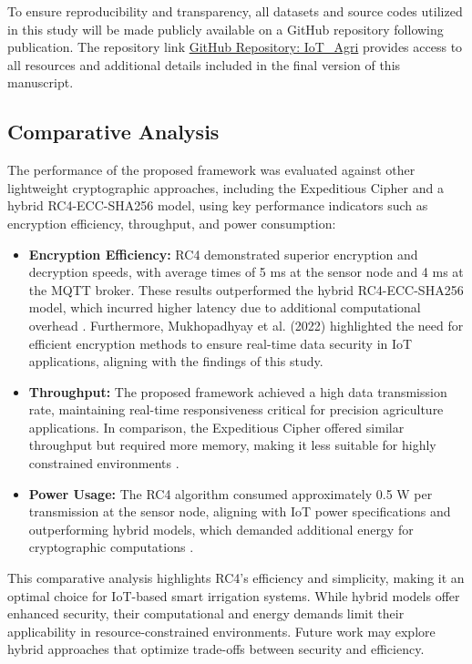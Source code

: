 \documentclass[journal]{Definitions/mdpi}
\begin{document}
To ensure reproducibility and transparency, all datasets and source codes utilized in this study will be made publicly available on a GitHub repository following publication. The repository link \href{https://github.com/saraswathi-test/IoT_Agri}{GitHub Repository: IoT\_Agri} provides access to all resources and additional details included in the final version of this manuscript.

\subsection{Comparative Analysis}

The performance of the proposed framework was evaluated against other lightweight cryptographic approaches, including the Expeditious Cipher and a hybrid RC4-ECC-SHA256 model, using key performance indicators such as encryption efficiency, throughput, and power consumption:

\begin{itemize}
    \item \textbf{Encryption Efficiency:} RC4 demonstrated superior encryption and decryption speeds, with average times of 5 ms at the sensor node and 4 ms at the MQTT broker. These results outperformed the hybrid RC4-ECC-SHA256 model, which incurred higher latency due to additional computational overhead \cite{ref-journal2, ref-journal6}. Furthermore, Mukhopadhyay et al. (2022) \cite{ref-mdpi9} highlighted the need for efficient encryption methods to ensure real-time data security in IoT applications, aligning with the findings of this study.
    \item \textbf{Throughput:} The proposed framework achieved a high data transmission rate, maintaining real-time responsiveness critical for precision agriculture applications. In comparison, the Expeditious Cipher offered similar throughput but required more memory, making it less suitable for highly constrained environments \cite{ref-mdpi1}.
    \item \textbf{Power Usage:} The RC4 algorithm consumed approximately 0.5 W per transmission at the sensor node, aligning with IoT power specifications and outperforming hybrid models, which demanded additional energy for cryptographic computations \cite{ref-journal7}.
\end{itemize}

This comparative analysis highlights RC4's efficiency and simplicity, making it an optimal choice for IoT-based smart irrigation systems. While hybrid models offer enhanced security, their computational and energy demands limit their applicability in resource-constrained environments. Future work may explore hybrid approaches that optimize trade-offs between security and efficiency.
\end{document}
